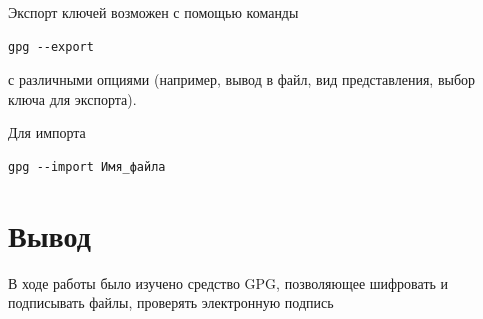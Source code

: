 \documentclass[10pt,a4paper]{article}
\begin{document}
Экспорт ключей возможен с помощью команды
\begin{verbatim}
gpg --export
\end{verbatim}
с различными опциями (например, вывод в файл, вид представления, выбор ключа для экспорта).

Для импорта
\begin{verbatim}
gpg --import Имя_файла
\end{verbatim}

\newpage

\section{Вывод}


В ходе работы было изучено средство GPG, позволяющее шифровать и подписывать файлы, проверять электронную подпись


\end{document}
